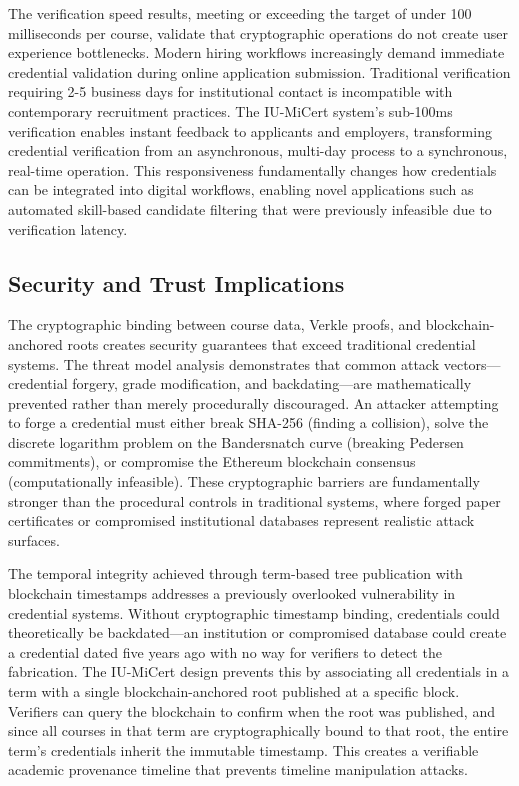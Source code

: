 The verification speed results, meeting or exceeding the target of under 100 milliseconds per course, validate that cryptographic operations do not create user experience bottlenecks. Modern hiring workflows increasingly demand immediate credential validation during online application submission. Traditional verification requiring 2-5 business days for institutional contact is incompatible with contemporary recruitment practices. The IU-MiCert system's sub-100ms verification enables instant feedback to applicants and employers, transforming credential verification from an asynchronous, multi-day process to a synchronous, real-time operation. This responsiveness fundamentally changes how credentials can be integrated into digital workflows, enabling novel applications such as automated skill-based candidate filtering that were previously infeasible due to verification latency.

\subsection{Security and Trust Implications}
\label{subsec:security-implications}

The cryptographic binding between course data, Verkle proofs, and blockchain-anchored roots creates security guarantees that exceed traditional credential systems. The threat model analysis demonstrates that common attack vectors—credential forgery, grade modification, and backdating—are mathematically prevented rather than merely procedurally discouraged. An attacker attempting to forge a credential must either break SHA-256 (finding a collision), solve the discrete logarithm problem on the Bandersnatch curve (breaking Pedersen commitments), or compromise the Ethereum blockchain consensus (computationally infeasible). These cryptographic barriers are fundamentally stronger than the procedural controls in traditional systems, where forged paper certificates or compromised institutional databases represent realistic attack surfaces.

The temporal integrity achieved through term-based tree publication with blockchain timestamps addresses a previously overlooked vulnerability in credential systems. Without cryptographic timestamp binding, credentials could theoretically be backdated—an institution or compromised database could create a credential dated five years ago with no way for verifiers to detect the fabrication. The IU-MiCert design prevents this by associating all credentials in a term with a single blockchain-anchored root published at a specific block. Verifiers can query the blockchain to confirm when the root was published, and since all courses in that term are cryptographically bound to that root, the entire term's credentials inherit the immutable timestamp. This creates a verifiable academic provenance timeline that prevents timeline manipulation attacks.

